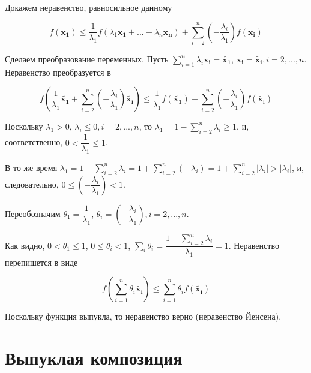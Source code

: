 	Докажем неравенство, равносильное данному
	
	\begin{equation}
	f(\mathbf{x_1})  \leqslant \frac{1}{\lambda_1}f(\lambda_1 \mathbf{x_1} +
	...+\lambda_n\mathbf{x_n})  + \sum\limits_{i=2}^{n}
	(-\frac{\lambda_i}{\lambda_1} )  f(\mathbf{x_i})
	\end{equation}
	
	Сделаем преобразование переменных. Пусть $\sum\limits_{i=1}^{n} \lambda_i
	\mathbf{x_i} = \mathbf{\tilde{x_1}}$, $\mathbf{x_i} = \mathbf{\tilde{x_i}},
	i=2,...,n$. Неравенство преобразуется в
	
	\begin{equation}
	f(\frac{1}{\lambda_1}\mathbf{\tilde{x_1}}  + \sum\limits_{i=2}^{n}
	(-\frac{\lambda_i}{\lambda_1} )  \mathbf{\tilde{x_i}})  \leqslant
	\frac{1}{\lambda_1}f(\mathbf{\tilde{x_1}})  + \sum\limits_{i=2}^{n}
	(-\frac{\lambda_i}{\lambda_1} )  f(\mathbf{\tilde{x_i}})
	\end{equation}
	
	Поскольку $\lambda_1 > 0$, $\lambda_i \leqslant 0, i=2,...,n$, то $\lambda_1 =
	1 - \sum\limits_{i=2}^{n}\lambda_i \geqslant 1$, и, соответственно, $0 <
	\dfrac{1}{\lambda_1} \leqslant 1$. 
	
	В то же время $\lambda_1 = 1 - \sum\limits_{i=2}^{n}\lambda_i = 1 +
	\sum\limits_{i=2}^{n}(-\lambda_i) = 1 + \sum\limits_{i=2}^{n}\left|
	\lambda_i\right| > \left| \lambda_i\right|$, и, следовательно, $0 \leqslant
	(-\dfrac{\lambda_i}{\lambda_1}) < 1$.
	
	Переобозначим $\theta_1 = \dfrac{1}{\lambda_1}$, $\theta_i =
	(-\dfrac{\lambda_i}{\lambda_1}), i=2,...,n$. 
	
	Как видно, $0<\theta_1 \leqslant 1$, $0 \leqslant \theta_i < 1$, $\sum\limits_i
	\theta_i = \dfrac{1 - \sum\limits_{i=2}^{n}\lambda_i}{\lambda_1}=1$. Неравенство
	перепишется в виде
	
	\begin{equation}
	f( \sum\limits_{i=1}^{n} \theta_i \mathbf{\tilde{x_i}})  \leqslant
	\sum\limits_{i=1}^{n} \theta_i  f(\mathbf{\tilde{x_i}})
	\end{equation}
	
	Поскольку функция выпукла, то неравенство верно (неравенство Йенсена).
	
	\section{Выпуклая композиция}
	
